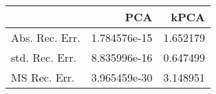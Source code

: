 \begin{tabular}{lrr}
\toprule
{} &           PCA &      kPCA \\
\midrule
Abs. Rec. Err. &  1.784576e-15 &  1.652179 \\
std. Rec. Err. &  8.835996e-16 &  0.647499 \\
MS Rec. Err.   &  3.965459e-30 &  3.148951 \\
\bottomrule
\end{tabular}
